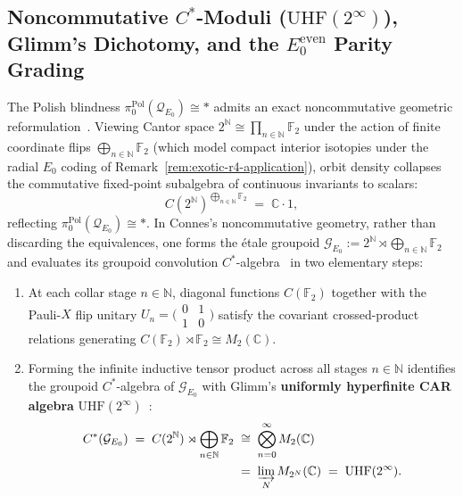 \documentclass[10pt,twoside,openright]{book}
\theoremstyle{crmplain}
\theoremstyle{crmdef}
\theoremstyle{crmremark}
\begin{document}
\subsection{\texorpdfstring{Noncommutative $C^*$-Moduli ($\mathrm{UHF}(2^\infty)$), Glimm's Dichotomy, and the $E_0^{\mathrm{even}}$ Parity Grading}{Noncommutative C*-Moduli (UHF(2\^{}infty)), Glimm's Dichotomy, and the E0-even Parity Grading}}\label{subsec:uhf-cstar-e0}

The Polish blindness $\pi_0^{\mathrm{Pol}}(\mathcal{Q}_{E_0}) \cong *$ admits an exact noncommutative geometric reformulation~\cite[Ch.~II, \S\S 7--8]{Connes94}. Viewing Cantor space $2^{\mathbb{N}} \cong \prod_{n \in \mathbb{N}} \mathbb{F}_2$ under the action of finite coordinate flips $\bigoplus_{n \in \mathbb{N}} \mathbb{F}_2$ (which model compact interior isotopies under the radial $E_0$ coding of Remark~\ref{rem:exotic-r4-application}), orbit density collapses the commutative fixed-point subalgebra of continuous invariants to scalars:
\[
  C(2^{\mathbb{N}})^{\bigoplus_{n \in \mathbb{N}} \mathbb{F}_2} \;=\; \mathbb{C}\cdot 1,
\]
reflecting $\pi_0^{\mathrm{Pol}}(\mathcal{Q}_{E_0}) \cong *$. In Connes's noncommutative geometry, rather than discarding the equivalences, one forms the étale groupoid $\mathcal{G}_{E_0} := 2^{\mathbb{N}} \rtimes \bigoplus_{n \in \mathbb{N}} \mathbb{F}_2$ and evaluates its groupoid convolution $C^*$-algebra~\cite[Ch.~II]{Connes94} in two elementary steps:
\begin{enumerate}[label=\textbf{\arabic*.},leftmargin=1.8em]
  \item At each collar stage $n \in \mathbb{N}$, diagonal functions $C(\mathbb{F}_2)$ together with the Pauli-$X$ flip unitary $U_n = \bigl(\begin{smallmatrix} 0 & 1 \\ 1 & 0 \end{smallmatrix}\bigr)$ satisfy the covariant crossed-product relations generating $C(\mathbb{F}_2) \rtimes \mathbb{F}_2 \cong M_2(\mathbb{C})$.
  \item Forming the infinite inductive tensor product across all stages $n \in \mathbb{N}$ identifies the groupoid $C^*$-algebra of $\mathcal{G}_{E_0}$ with Glimm's \textbf{uniformly hyperfinite CAR algebra} $\mathrm{UHF}(2^\infty)$~\cite{Glimm60}:
  \[
    \begin{aligned}
      C^*(\mathcal{G}_{E_0}) \;=\; C(2^{\mathbb{N}}) \rtimes \bigoplus_{n \in \mathbb{N}} \mathbb{F}_2
      &\;\cong\; \bigotimes_{n=0}^{\infty} M_2(\mathbb{C}) \\
      &\;=\; \varinjlim_N M_{2^N}(\mathbb{C}) \;=\; \mathrm{UHF}(2^\infty).
    \end{aligned}
  \]
\end{enumerate}
\end{document}
